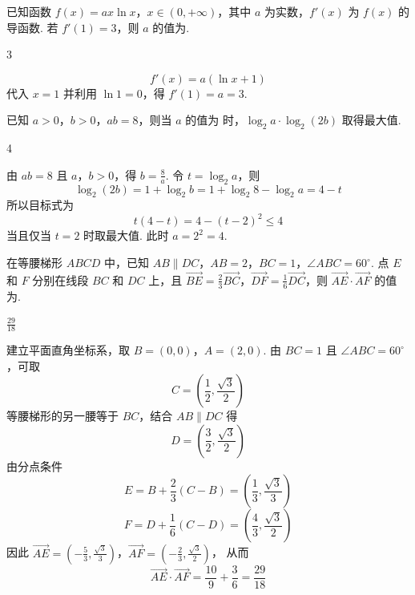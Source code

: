 \begin{problem}
已知函数 \(f(x) = ax \ln x\)，\(x \in (0, +\infty)\)，其中 \( a \) 为实数，\( f'(x) \) 为 \( f(x) \) 的导函数. 若 \( f'(1) = 3 \)，则 \( a \) 的值为\fillinblank{}.
\end{problem}

\begin{answer}
3
\end{answer}

\begin{solution}
\[
f'(x)=a(\ln x+1)
\]
代入 \(x=1\) 并利用 \(\ln1=0\)，得 \(f'(1)=a=3\).
\end{solution}

\begin{problem}
已知 \(a > 0\)，\(b > 0\)，\(ab = 8\)，则当 \(a\) 的值为\fillinblank{} 时，\(\log_2 a \cdot \log_2 (2b)\) 取得最大值.
\end{problem}

\begin{answer}
4
\end{answer}

\begin{solution}
由 \(ab=8\) 且 \(a\)，\(b>0\)，得 \(b=\frac8a\). 令 \(t=\log_2a\)，则
\[
\log_2(2b)=1+\log_2b=1+\log_2 8-\log_2a=4-t
\]
所以目标式为
\[
t(4-t)=4-(t-2)^2\leqslant4
\]
当且仅当 \(t=2\) 时取最大值. 此时 \(a=2^2=4\).
\end{solution}

\begin{problem}
在等腰梯形 \(ABCD\) 中，已知 \(AB \parallel DC\)，\(AB = 2\)，\(BC = 1\)，\(\angle ABC = 60^\circ\). 点 \(E\) 和 \(F\) 分别在线段 \(BC\) 和 \(DC\) 上，且 \(\overrightarrow{BE} = \frac{2}{3} \overrightarrow{BC}\)，\(\overrightarrow{DF} = \frac{1}{6} \overrightarrow{DC}\)，则 \(\overrightarrow{AE} \cdot \overrightarrow{AF}\) 的值为\fillinblank{}.
\end{problem}

\begin{answer}
\(\frac{29}{18}\)
\end{answer}

\begin{solution}
建立平面直角坐标系，取 \(B=(0,0)\)，\(A=(2,0)\). 由 \(BC=1\) 且 \(\angle ABC=60^\circ\)，可取
\[
C=\left(\frac12,\frac{\sqrt3}{2}\right)
\]
等腰梯形的另一腰等于 \(BC\)，结合 \(AB\parallel DC\) 得
\[
D=\left(\frac32,\frac{\sqrt3}{2}\right)
\]
由分点条件
\[
E=B+\frac23(C-B)=\left(\frac13,\frac{\sqrt3}{3}\right)
\]
\[
F=D+\frac16(C-D)=\left(\frac43,\frac{\sqrt3}{2}\right)
\]
因此
\(\overrightarrow{AE}=\left(-\frac53,\frac{\sqrt3}{3}\right)\)，\(\overrightarrow{AF}=\left(-\frac23,\frac{\sqrt3}{2}\right)\)，
从而
\[
\overrightarrow{AE}\cdot\overrightarrow{AF}=\frac{10}{9}+\frac{3}{6}=\frac{29}{18}
\]
\end{solution}

